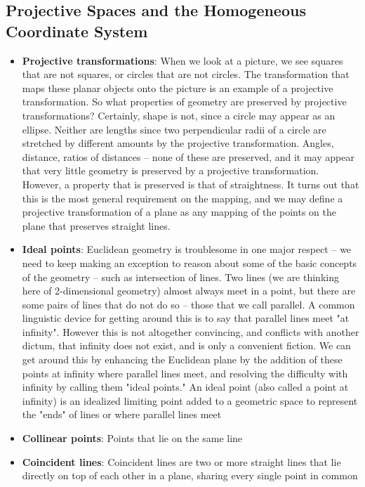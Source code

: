 \documentclass{report}
\begin{document}
    \subsection{Projective Spaces and the Homogeneous Coordinate System}
    \begin{itemize}
        \item \textbf{Projective transformations}: When we look at a picture, we see squares that are not squares, or circles that are not circles. The transformation that maps these planar objects onto the picture is an example of a projective transformation. 
            \bigbreak \noindent 
            So what properties of geometry are preserved by projective transformations? Certainly, shape is not, since a circle may appear as an ellipse. Neither are lengths since two perpendicular radii of a circle are stretched by different amounts by the projective transformation. Angles, distance, ratios of distances – none of these are preserved, and it may appear that very little geometry is preserved by a projective transformation. However, a property that is preserved is that of straightness. It turns out that this is the most general requirement on the mapping, and we may define a projective transformation of a plane as any mapping of the points on the plane that preserves straight lines.
        \item \textbf{Ideal points}: Euclidean geometry is troublesome in one major respect – we need to keep making an exception to reason about some of the basic concepts of the geometry – such as intersection of lines. Two lines (we are thinking here of 2-dimensional geometry) almost always meet in a point, but there are some pairs of lines that do not do so – those that we call parallel. A common linguistic device for getting around this is to say that parallel lines meet "at infinity". However this is not altogether convincing, and conflicts with another dictum, that infinity does not exist, and is only a convenient fiction. We can get around this by enhancing the Euclidean plane by the addition of these points at infinity where parallel lines meet, and resolving the difficulty with infinity by calling them "ideal points."
            \bigbreak \noindent 
            An ideal point (also called a point at infinity) is an idealized limiting point added to a geometric space to represent the "ends" of lines or where parallel lines meet
        \item \textbf{Collinear points}: Points that lie on the same line
        \item \textbf{Coincident lines}: Coincident lines are two or more straight lines that lie directly on top of each other in a plane, sharing every single point in common

\end{itemize}
\end{document}
